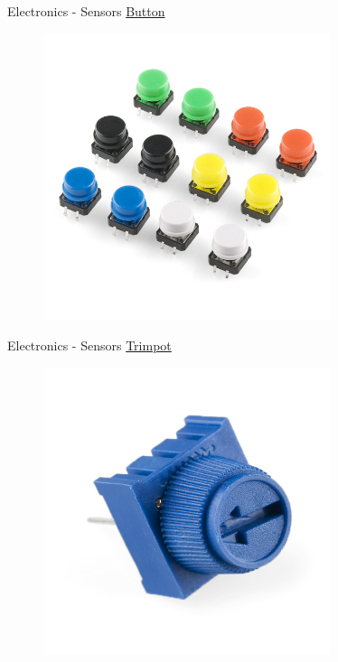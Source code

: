 \documentclass{beamer}
\begin{document}
\begin{frame}{Electronics - Sensors}
    \href{https://www.sparkfun.com/products/10302}{Button}
    \begin{figure}[h]
        \includegraphics[width=0.75\textwidth]{buttons.jpg}
    \end{figure}
\end{frame}

\begin{frame}{Electronics - Sensors}
    \href{https://www.sparkfun.com/products/9806}{Trimpot}
    \begin{figure}[h]
        \includegraphics[width=0.75\textwidth]{trimpot.jpg}
    \end{figure}
\end{frame}
\end{document}
